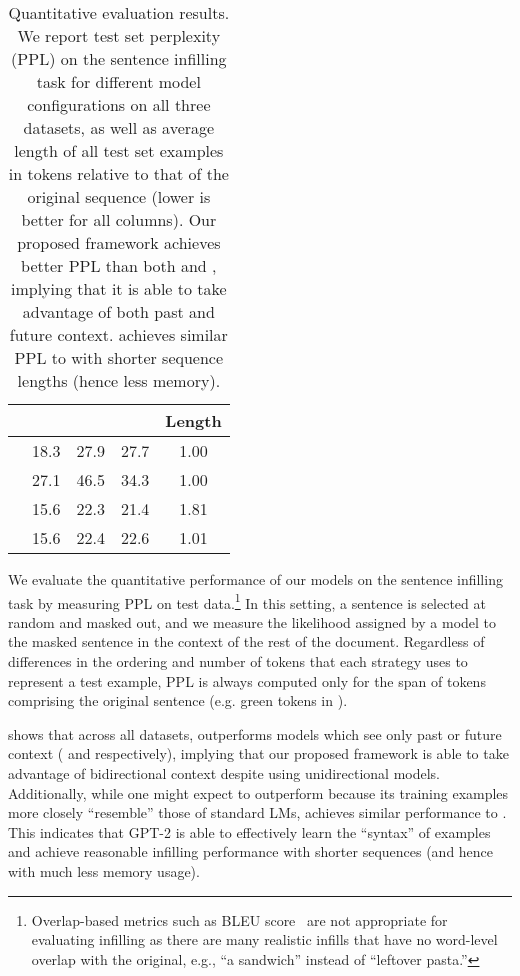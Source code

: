 \begin{table}[t]
    \centering
    \begin{tabular}[t]{lcccc}
        \toprule
            & \sto{}   & \abs{}   & \lyr{}   & Length \\
        \midrule
\lm{} & 18.3 & 27.9 & 27.7 & 1.00\\
\lmrev{} & 27.1 & 46.5 & 34.3 & 1.00 \\ 
\lmall{} & 15.6 & 22.3 & 21.4 & 1.81\\
\ilm{} & 15.6 & 22.4 & 22.6 & 1.01 \\
        \bottomrule
    \end{tabular}
    \caption{Quantitative evaluation results. We report test set perplexity (PPL) on the sentence infilling task for different model configurations on all three datasets, as well as average length of all test set examples in tokens relative to that of the original sequence (lower is better for all columns). 
    Our proposed \ilm{} framework achieves better PPL than both \lm{} and \lmrev{}, implying that it is able to take advantage of both past and future context. 
    \ilm{} achieves similar PPL to \lmall{} with shorter sequence lengths (hence less memory).}
    \label{tab:ppl_sentences}
\end{table}%

We evaluate the quantitative performance of our models on the sentence infilling task by measuring PPL on test data.\footnote{Overlap-based metrics such as BLEU score~\citep{papineni2002bleu} are not appropriate for evaluating infilling as there are many realistic infills that have no word-level overlap with the original, e.g., ``a sandwich'' instead of ``leftover pasta.''} 
In this setting, a sentence is selected at random and masked out, and we measure the likelihood assigned by a model to the masked sentence in the context of the rest of the document. 
Regardless of differences in the ordering and number of tokens that each strategy uses to represent a test example, 
PPL is always computed only for the span of tokens comprising the original sentence (e.g. green tokens in ). 

 shows that across all datasets, \ilm{} outperforms models which see only past or future context (\lm{} and \lmrev{} respectively), 
implying that our proposed framework is able to take advantage of bidirectional context despite using unidirectional models. 
Additionally, 
while one might expect \lmall{} to outperform \ilm{} because its training examples more closely ``resemble'' those of standard LMs, 
\ilm{} achieves similar performance to \lmall{}.
This indicates that GPT-2 is able to effectively learn the ``syntax'' of \ilm{} examples and achieve reasonable infilling performance with shorter sequences (and hence with much less memory usage).

